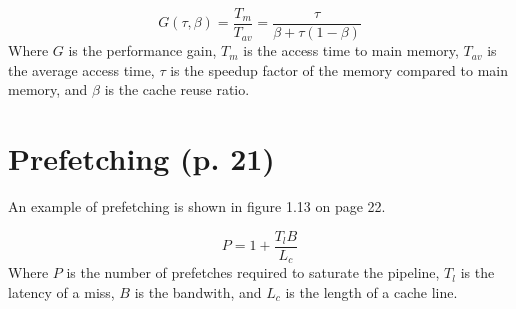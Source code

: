 \documentclass{article}
\begin{document}
		\begin{equation}
			G(\tau, \beta)=\frac{T_m}{T_{av}}=\frac{\tau}{\beta+\tau(1-\beta)}
		\end{equation}
		Where $G$ is the performance gain, $T_m$ is the access time to main memory, $T_{av}$ is the average access time, $\tau$ is the speedup factor of the memory compared to main memory, and $\beta$ is the cache reuse ratio.
	
	\section{Prefetching (p. 21)}
		An example of prefetching is shown in figure 1.13 on page 22.
	
		\begin{equation}
			P=1+\frac{T_l B}{L_c}
		\end{equation}
		Where $P$ is the number of prefetches required to saturate the pipeline, $T_l$ is the latency of a miss, $B$ is the bandwith, and $L_c$ is the length of a cache line.
\end{document}
